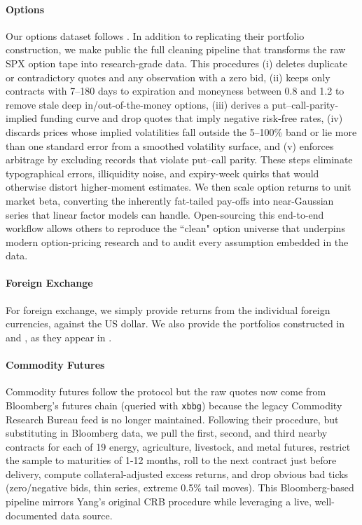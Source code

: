 \documentclass{article}
\begin{document}


\paragraph{Options}
Our options dataset follows \cite{Constantinides2013}. In addition to replicating
their portfolio construction, we make public the full cleaning pipeline that transforms the raw SPX option tape into research-grade data.  This procedures (i) deletes duplicate or contradictory quotes and any observation with a zero bid, (ii) keeps only contracts with 7--180 days to expiration and moneyness between 0.8 and 1.2 to remove stale deep in/out-of-the-money options, (iii) derives a put--call-parity-implied funding curve and drop quotes that imply negative risk-free rates, (iv) discards prices whose implied volatilities fall outside the 5--100\% band or lie more than one standard error from a smoothed volatility surface, and (v) enforces arbitrage by excluding records that violate put--call parity.  These steps eliminate typographical errors, illiquidity noise, and expiry-week quirks that would otherwise distort higher-moment estimates.  We then scale option returns to unit market beta, converting the inherently fat-tailed pay-offs into near-Gaussian series that linear factor models can handle.  Open-sourcing this end-to-end workflow allows others to reproduce the ``clean" option universe that underpins modern option-pricing research and to audit every assumption embedded in the data.

\paragraph{Foreign Exchange}
For foreign exchange, we simply provide returns from the individual foreign currencies, against the US dollar. We also provide the portfolios constructed in \cite{Lettau2014} and \cite{Menkhoff2012}, as they appear in \cite{He2017}.

\paragraph{Commodity Futures}
Commodity futures follow the \cite{Yang2013} protocol but the raw quotes now
come from Bloomberg's futures chain (queried with \texttt{xbbg}) because the
legacy Commodity Research Bureau feed is no longer maintained.  Following their procedure, but substituting in Bloomberg data, we pull the
first, second, and third nearby contracts for each of 19 energy, agriculture, livestock, and
metal futures, restrict the sample to maturities of 1-12 months, roll to the
next contract just before delivery, compute collateral-adjusted excess returns,
and drop obvious bad ticks (zero/negative bids, thin series, extreme 0.5\% tail 
moves).  This Bloomberg-based pipeline mirrors Yang's original CRB procedure
while leveraging a live, well-documented data source.
\end{document}
